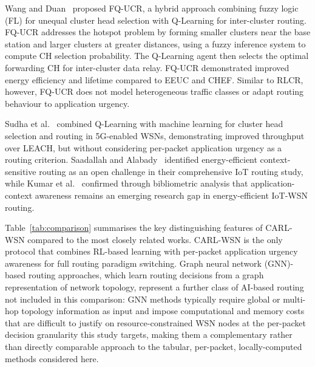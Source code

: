 \documentclass[12pt]{article}
\begin{document}
Wang and Duan~\cite{wang_fqucr_2025} proposed FQ-UCR, a hybrid
approach combining fuzzy logic (FL) for unequal cluster head selection
with Q-Learning for inter-cluster routing. FQ-UCR addresses the
hotspot problem by forming smaller clusters near the base station
and larger clusters at greater distances, using a fuzzy inference
system to compute CH selection probability. The Q-Learning agent then
selects the optimal forwarding CH for inter-cluster data relay.
FQ-UCR demonstrated improved energy efficiency and lifetime compared
to EEUC and CHEF. Similar to RLCR, however, FQ-UCR does not model
heterogeneous traffic classes or adapt routing behaviour to
application urgency.

Sudha et al.~\cite{sudha_intelligent_2025} combined Q-Learning with
machine learning for cluster head selection and routing in 5G-enabled
WSNs, demonstrating improved throughput over LEACH, but without
considering per-packet application urgency as a routing criterion.
Saadallah and Alabady~\cite{saadallah_comprehensive_2024} identified
energy-efficient context-sensitive routing as an open challenge in
their comprehensive IoT routing study, while Kumar
et al.~\cite{kumar_exploring_2025} confirmed through bibliometric
analysis that application-context awareness remains an emerging
research gap in energy-efficient IoT-WSN routing.

Table~\ref{tab:comparison} summarises the key distinguishing features
of CARL-WSN compared to the most closely related works. CARL-WSN is
the only protocol that combines RL-based learning with per-packet
application urgency awareness for full routing paradigm switching.
Graph neural network (GNN)-based routing approaches, which learn
routing decisions from a graph representation of network topology,
represent a further class of AI-based routing not included in this
comparison: GNN methods typically require global or multi-hop
topology information as input and impose computational and memory
costs that are difficult to justify on resource-constrained WSN
nodes at the per-packet decision granularity this study targets,
making them a complementary rather than directly comparable
approach to the tabular, per-packet, locally-computed methods
considered here.
\end{document}
